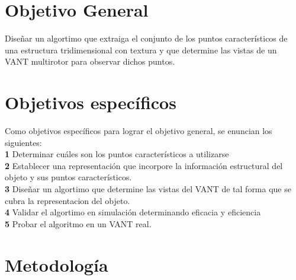 \documentclass[]{report}
\begin{document}
\section{Objetivo General}
 Diseñar un algortimo que extraiga el conjunto de los puntos característicos de una estructura tridimensional con textura y que determine las vistas de un VANT multirotor para observar dichos puntos.

\section{Objetivos específicos}
Como objetivos específicos para lograr el objetivo general, se enuncian los siguientes:\\
 \textbf {1} Determinar cuáles son los puntos característicos a utilizarse\\
 \textbf {2} Establecer una representación que incorpore la información estructural del objeto y sus puntos característicos.\\
\textbf {3} Diseñar un algortimo que determine las vistas del VANT de tal forma que se cubra la representacion del objeto.\\
\textbf {4} Validar el algortimo en simulación determinando eficacia  y eficiencia\\
\textbf{5} Probar el algoritmo en un VANT real.


\section{Metodología}
\end{document}
